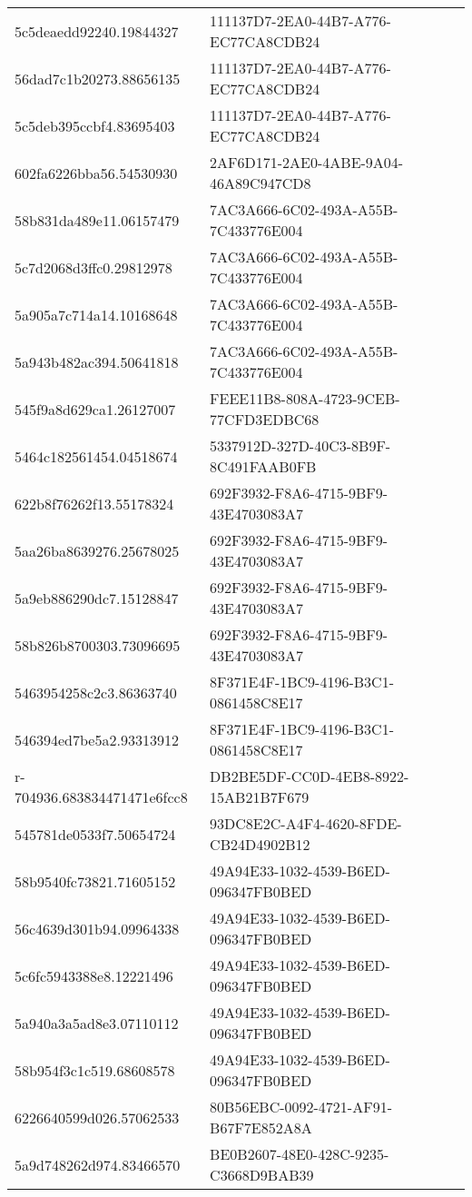 \begin{tabular}{ll}
5c5deaedd92240.19844327 & 111137D7-2EA0-44B7-A776-EC77CA8CDB24 \\
56dad7c1b20273.88656135 & 111137D7-2EA0-44B7-A776-EC77CA8CDB24 \\
5c5deb395ccbf4.83695403 & 111137D7-2EA0-44B7-A776-EC77CA8CDB24 \\
602fa6226bba56.54530930 & 2AF6D171-2AE0-4ABE-9A04-46A89C947CD8 \\
58b831da489e11.06157479 & 7AC3A666-6C02-493A-A55B-7C433776E004 \\
5c7d2068d3ffc0.29812978 & 7AC3A666-6C02-493A-A55B-7C433776E004 \\
5a905a7c714a14.10168648 & 7AC3A666-6C02-493A-A55B-7C433776E004 \\
5a943b482ac394.50641818 & 7AC3A666-6C02-493A-A55B-7C433776E004 \\
545f9a8d629ca1.26127007 & FEEE11B8-808A-4723-9CEB-77CFD3EDBC68 \\
5464c182561454.04518674 & 5337912D-327D-40C3-8B9F-8C491FAAB0FB \\
622b8f76262f13.55178324 & 692F3932-F8A6-4715-9BF9-43E4703083A7 \\
5aa26ba8639276.25678025 & 692F3932-F8A6-4715-9BF9-43E4703083A7 \\
5a9eb886290dc7.15128847 & 692F3932-F8A6-4715-9BF9-43E4703083A7 \\
58b826b8700303.73096695 & 692F3932-F8A6-4715-9BF9-43E4703083A7 \\
5463954258c2c3.86363740 & 8F371E4F-1BC9-4196-B3C1-0861458C8E17 \\
546394ed7be5a2.93313912 & 8F371E4F-1BC9-4196-B3C1-0861458C8E17 \\
r-704936.683834471471e6fcc8 & DB2BE5DF-CC0D-4EB8-8922-15AB21B7F679 \\
545781de0533f7.50654724 & 93DC8E2C-A4F4-4620-8FDE-CB24D4902B12 \\
58b9540fc73821.71605152 & 49A94E33-1032-4539-B6ED-096347FB0BED \\
56c4639d301b94.09964338 & 49A94E33-1032-4539-B6ED-096347FB0BED \\
5c6fc5943388e8.12221496 & 49A94E33-1032-4539-B6ED-096347FB0BED \\
5a940a3a5ad8e3.07110112 & 49A94E33-1032-4539-B6ED-096347FB0BED \\
58b954f3c1c519.68608578 & 49A94E33-1032-4539-B6ED-096347FB0BED \\
6226640599d026.57062533 & 80B56EBC-0092-4721-AF91-B67F7E852A8A \\
5a9d748262d974.83466570 & BE0B2607-48E0-428C-9235-C3668D9BAB39 \\

\end{tabular}
